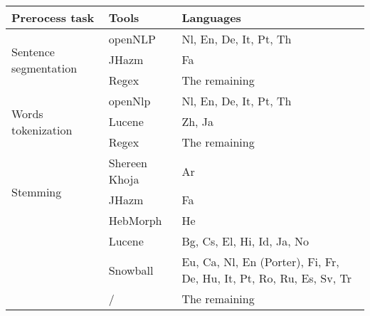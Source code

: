 \begin{tabular}{p{}p{}p{}} 
\hline \hline
Prerocess task & Tools & Languages \\
\hline
\multirow{3}{2cm}{Sentence segmentation} & openNLP\tablefootnote{\url{https://opennlp.apache.org/}} & Nl, En, De, It, Pt, Th \\
\cline{2-3}
& JHazm\tablefootnote{\url{https://github.com/mojtaba-khallash/JHazm}} & Fa \\
\cline{2-3}
& Regex & The remaining \\
\hline
\multirow{3}{2cm}{Words tokenization} & openNlp & Nl, En, De, It, Pt, Th \\
\cline{2-3}
& Lucene\tablefootnote{\url{https://lucene.apache.org/}} & Zh, Ja \\
\cline{2-3}
& Regex & The remaining \\
\hline
\multirow{3}{2cm}{Stemming} & Shereen Khoja\tablefootnote{\url{http://zeus.cs.pacificu.edu/shereen/research.htm}} & Ar \\
\cline{2-3}
& JHazm & Fa \\
\cline{2-3}
& HebMorph\tablefootnote{\url{http://code972.com/hebmorph}} & He \\
\cline{2-3}
& Lucene & Bg, Cs, El, Hi, Id, Ja, No \\
\cline{2-3}
& Snowball\tablefootnote{\url{http://snowball.tartarus.org/}} & Eu, Ca, Nl, En (Porter), Fi, Fr, De, Hu, It, Pt, Ro, Ru, Es, Sv, Tr \\
\cline{2-3}
& / & The remaining \\
\hline \hline
\end{tabular}
